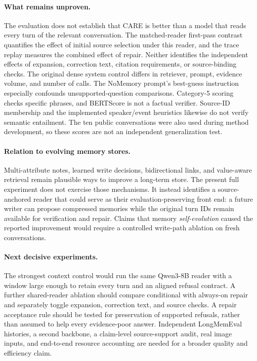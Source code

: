 \documentclass[11pt]{article}
\newcommand{\care}{\textsc{CARE}}
\begin{document}
\paragraph{What remains unproven.}
The evaluation does not establish that \care{} is better than a model that
reads every turn of the relevant conversation. The matched-reader first-pass
contrast quantifies the effect of initial source selection under this reader,
and the trace replay measures the combined effect of repair. Neither identifies
the independent effects of expansion, correction text, citation requirements,
or source-binding checks. The original dense system control differs in
retriever, prompt, evidence volume, and number of calls. The NoMemory prompt's best-guess instruction
especially confounds unsupported-question comparisons. Category-5 scoring
checks specific phrases, and BERTScore is not a factual verifier. Source-ID
membership and the implemented speaker/event heuristics likewise do not
verify semantic entailment. The ten
public conversations were also used during method development, so these
scores are not an independent generalization test.

\paragraph{Relation to evolving memory stores.}
Multi-attribute notes, learned write decisions, bidirectional links, and
value-aware retrieval remain plausible ways to improve a long-term store.
The present full experiment does not exercise
those mechanisms. It instead identifies a source-anchored reader that could
serve as their evaluation-preserving front end: a future writer can propose
compressed memories while the original turn IDs remain available for
verification and repair. Claims that memory \emph{self-evolution} caused
the reported improvement would require a controlled write-path ablation
on fresh conversations.

\paragraph{Next decisive experiments.}
The strongest context control would run the same Qwen3-8B reader with a
window large enough to retain every turn and an aligned refusal contract.
A further shared-reader ablation should compare conditional with always-on
repair and separately toggle expansion, correction text, and source checks.
A repair
acceptance rule should be tested for preservation of supported refusals,
rather than assumed to help every evidence-poor answer. Independent
LongMemEval histories, a second backbone, a claim-level source-support audit,
real image inputs, and end-to-end resource accounting are needed for a broader
quality and efficiency claim.
\end{document}
